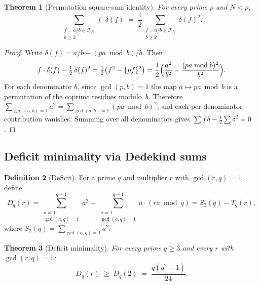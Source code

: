\documentclass[11pt]{article}
\newtheorem{theorem}{Theorem}[section]
\theoremstyle{definition}
\newtheorem{definition}[theorem]{Definition}
\newcommand{\F}{\mathcal{F}}
\begin{document}
\begin{theorem}[Permutation square-sum identity]\label{thm:perm-sq}
For every prime $p$ and $N < p$,
\begin{equation}\label{eq:perm-sq}
  \sum_{\substack{f = a/b \in \F_N \\ b \ge 2}}
    f \cdot \delta(f)
  \;=\; \frac{1}{2}
  \sum_{\substack{f = a/b \in \F_N \\ b \ge 2}}
    \delta(f)^2.
\end{equation}
\end{theorem}

\begin{proof}
Write $\delta(f) = a/b - (pa \bmod b)/b$.  Then
\[
  f \cdot \delta(f) - \tfrac{1}{2}\,\delta(f)^2
  = \tfrac{1}{2}\bigl(f^2 - \{pf\}^2\bigr)
  = \frac{1}{2}\Bigl(\frac{a^2}{b^2} - \frac{(pa \bmod b)^2}{b^2}\Bigr).
\]
For each denominator $b$, since $\gcd(p,b) = 1$ the map
$a \mapsto pa \bmod b$ is a permutation of the coprime residues
modulo~$b$.  Therefore
$\sum_{\gcd(a,b)=1} a^2 = \sum_{\gcd(a,b)=1} (pa \bmod b)^2$,
and each per-denominator contribution vanishes.  Summing over all
denominators gives $\sum f\,\delta - \tfrac{1}{2}\sum \delta^2 = 0$.
\end{proof}

\subsection{Deficit minimality via Dedekind sums}\label{sec:deficit-min}

\begin{definition}[Deficit]\label{def:deficit}
For a prime $q$ and multiplier $r$ with $\gcd(r,q) = 1$, define
\[
  D_q(r) = \sum_{\substack{a=1 \\ \gcd(a,q) = 1}}^{q-1}
    a^2 - \sum_{\substack{a=1 \\ \gcd(a,q) = 1}}^{q-1}
    a \cdot (ra \bmod q)
  = S_2(q) - T_q(r),
\]
where $S_2(q) = \sum_{\gcd(a,q)=1} a^2$.
\end{definition}

\begin{theorem}[Deficit minimality]\label{thm:deficit-min}
For every prime $q \ge 3$ and every $r$ with $\gcd(r,q) = 1$:
\begin{equation}\label{eq:deficit-min}
  D_q(r) \;\ge\; D_q(2) \;=\; \frac{q(q^2-1)}{24}.
\end{equation}
\end{theorem}
\end{document}
